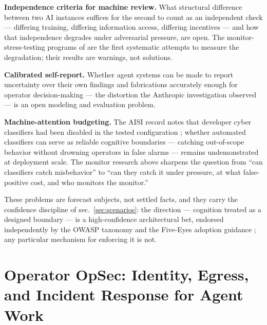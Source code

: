\documentclass[
  english,
  9pt,
]{extarticle}
\begin{document}
\textbf{Independence criteria for machine review.} What structural
difference between two AI instances suffices for the second to count as
an independent check --- differing training, differing information
access, differing incentives --- and how that independence degrades
under adversarial pressure, are open. The monitor-stress-testing
programs of \citep{aisi_control_red_team, apollo_automode, shade_arena}
are the first systematic attempts to measure the degradation; their
results are warnings, not solutions.

\textbf{Calibrated self-report.} Whether agent systems can be made to
report uncertainty over their own findings and fabrications accurately
enough for operator decision-making --- the distortion the Anthropic
investigation observed \citep{anthropic_campaign_report} --- is an open
modeling and evaluation problem.

\textbf{Machine-attention budgeting.} The AISI record notes that
developer cyber classifiers had been disabled in the tested
configuration \citep{aisi_incident_report}; whether automated
classifiers can serve as reliable cognitive boundaries --- catching
out-of-scope behavior without drowning operators in false alarms ---
remains undemonstrated at deployment scale. The monitor research above
sharpens the question from ``can classifiers catch misbehavior'' to
``can they catch it under pressure, at what false-positive cost, and who
monitors the monitor.''

These problems are forecast subjects, not settled facts, and they carry
the confidence discipline of sec.~\ref{sec:scenarios}: the direction ---
cognition treated as a designed boundary --- is a high-confidence
architectural bet, endorsed independently by the OWASP taxonomy
\citep{owasp_agentic_top10} and the Five-Eyes adoption guidance
\citep{cisa_agentic_guidance}; any particular mechanism for enforcing it
is not.

\newpage

\section{Operator OpSec: Identity, Egress, and Incident Response for
Agent Work}\label{sec:opsec}
\end{document}
